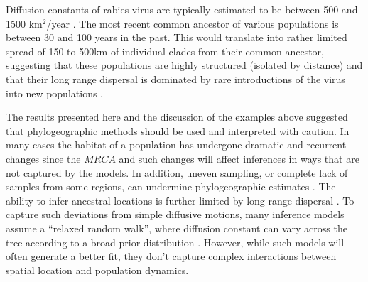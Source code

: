 \documentclass[aps,rmp, twocolumn]{revtex4}
\begin{document}
Diffusion constants of rabies virus are typically estimated to be between 500 and 1500 km$^2$/year \citep{dellicour_using_2017}.
The most recent common ancestor of various populations is between 30 and 100 years in the past.
This would translate into rather limited spread of 150 to 500km of individual clades from their common ancestor, suggesting that these populations are highly structured (isolated by distance) and that their long range dispersal is dominated by rare introductions of the virus into new populations \citep{brunker_elucidating_2015}.

The results presented here and the discussion of the examples above suggested that phylogeographic methods should be used and interpreted with caution.
In many cases the habitat of a population has undergone dramatic and recurrent changes since the $MRCA$ and such changes will affect inferences in ways that are not captured by the models.
In addition, uneven sampling, or complete lack of samples from some regions, can undermine phylogeographic estimates \citep{kalkauskas_sampling_2021,layan_impact_2023}.
The ability to infer ancestral locations is further limited by long-range dispersal \citep{hallatschek_acceleration_2014}.
To capture such deviations from simple diffusive motions, many inference models assume a ``relaxed random walk'', where diffusion constant can vary across the tree according to a broad prior distribution \citep{dellicour_relax_2021}.
However, while such models will often generate a better fit, they don't capture complex interactions between spatial location and population dynamics.
\end{document}
